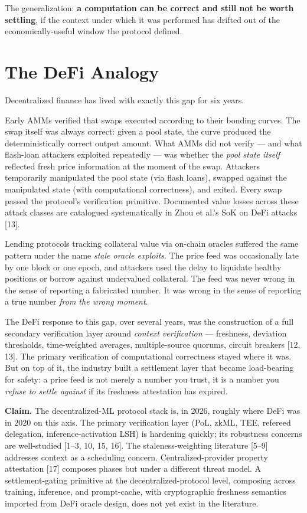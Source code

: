 \documentclass[11pt]{article}
\begin{document}
The generalization: \textbf{a computation can be correct and still not be worth settling}, if the context under which it was performed has drifted out of the economically-useful window the protocol defined.

\section{The DeFi Analogy}

Decentralized finance has lived with exactly this gap for six years.

Early AMMs verified that swaps executed according to their bonding curves. The swap itself was always correct: given a pool state, the curve produced the deterministically correct output amount. What AMMs did not verify --- and what flash-loan attackers exploited repeatedly --- was whether the \emph{pool state itself} reflected fresh price information at the moment of the swap. Attackers temporarily manipulated the pool state (via flash loans), swapped against the manipulated state (with computational correctness), and exited. Every swap passed the protocol's verification primitive. Documented value losses across these attack classes are catalogued systematically in Zhou et al.'s SoK on DeFi attacks [13].

Lending protocols tracking collateral value via on-chain oracles suffered the same pattern under the name \emph{stale oracle exploits}. The price feed was occasionally late by one block or one epoch, and attackers used the delay to liquidate healthy positions or borrow against undervalued collateral. The feed was never wrong in the sense of reporting a fabricated number. It was wrong in the sense of reporting a true number \emph{from the wrong moment}.

The DeFi response to this gap, over several years, was the construction of a full secondary verification layer around \emph{context verification} --- freshness, deviation thresholds, time-weighted averages, multiple-source quorums, circuit breakers [12, 13]. The primary verification of computational correctness stayed where it was. But on top of it, the industry built a settlement layer that became load-bearing for safety: a price feed is not merely a number you trust, it is a number you \emph{refuse to settle against} if its freshness attestation has expired.

\textbf{Claim.} The decentralized-ML protocol stack is, in 2026, roughly where DeFi was in 2020 on this axis. The primary verification layer (PoL, zkML, TEE, refereed delegation, inference-activation LSH) is hardening quickly; its robustness concerns are well-studied [1--3, 10, 15, 16]. The staleness-weighting literature [5--9] addresses context as a scheduling concern. Centralized-provider property attestation [17] composes phases but under a different threat model. A settlement-gating primitive at the decentralized-protocol level, composing across training, inference, and prompt-cache, with cryptographic freshness semantics imported from DeFi oracle design, does not yet exist in the literature.
\end{document}
